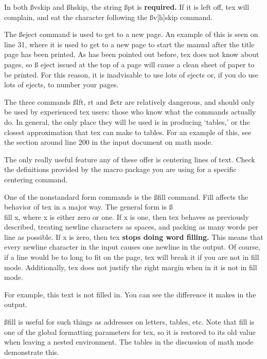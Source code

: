 In both {\ss vskip} and {\ss hskip,} the string {\ss pt} is {\bf
required.} If it is left off, tex will complain, and eat the
character following the {\ss v[h]skip} command.

The {\ss eject} command is used to get to a new page. An example
of this is seen on line 31, where it is used to get to a new page
to start the manual after the title page has been printed. As has
been pointed out before, tex does not know about pages, so {\ss
eject} issued at the top of a page will cause a clean sheet of
paper to be printed. For this reason, it is inadvisable to use
lots of ejects or, if you do use lots of ejects, to number
your pages.

The three commands {\ss lft, rt} and {\ss ctr} are relatively
dangerous, and should only be used by experienced tex users:
those who know what the commands actually do. In general, the only
place they will be used is in producing `tables,' or the closest
approximation that tex can make to tables. For an example of this,
see the section around line 200 in the input document on math
mode.

The only really useful feature any of these offer is centering
lines of text. Check the definitions provided by the macro
package you are using for a specific centering command.


One of the nonstandard form commands is the {\ss fill} command.
Fill affects the behavior of tex in a major way. The general form
is {\ss \\fill x,} where x is either zero or one. If x is one,
then tex behaves as previously described, treating newline
characters as spaces, and packing as many words per line as
possible. If x is zero, then tex {\bf stops doing word filling.}
This means that every newline character in the input causes one
newline in the output. Of course, if a line would be to long to
fit on the page, tex will break it if you are not in fill mode.
Additionally, tex does not justify the right margin when in it is
not in fill mode.

{
For example, this text is not
filled in. You can see the difference
it makes in the output.}

{\ss fill} is useful for such things as addresses on letters,
tables, etc. Note that fill is one of the global formatting
parameters for tex, so it is restored to its old value when
leaving a nested environment. The tables in the discussion of
math mode demonstrate this.

